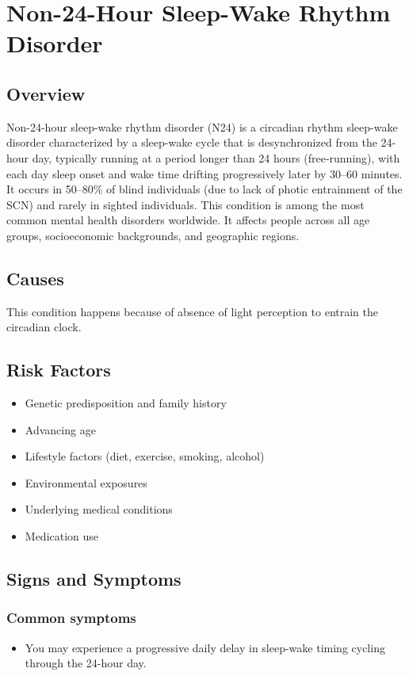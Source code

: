 \chapter{Non-24-Hour Sleep-Wake Rhythm Disorder}
\label{sec:Non-24-Hour Sleep-Wake Rhythm Disorder}

\section{Overview}
Non-24-hour sleep-wake rhythm disorder (N24) is a circadian rhythm sleep-wake disorder characterized by a sleep-wake cycle that is desynchronized from the 24-hour day, typically running at a period longer than 24 hours (free-running), with each day sleep onset and wake time drifting progressively later by 30--60 minutes. It occurs in 50--80\% of blind individuals (due to lack of photic entrainment of the SCN) and rarely in sighted individuals. This condition is among the most common mental health disorders worldwide. It affects people across all age groups, socioeconomic backgrounds, and geographic regions.
\section{Causes}
This condition happens because of absence of light perception to entrain the circadian clock.     
\section{Risk Factors}

\begin{itemize}[noitemsep]
  \item Genetic predisposition and family history
  \item Advancing age
  \item Lifestyle factors (diet, exercise, smoking, alcohol)
  \item Environmental exposures
  \item Underlying medical conditions
  \item Medication use
\end{itemize}
\section{Signs and Symptoms}

\subsection{Common symptoms}
\begin{itemize}[noitemsep]
  \item You may experience a progressive daily delay in sleep-wake timing cycling through the 24-hour day. 
  \end{itemize}

